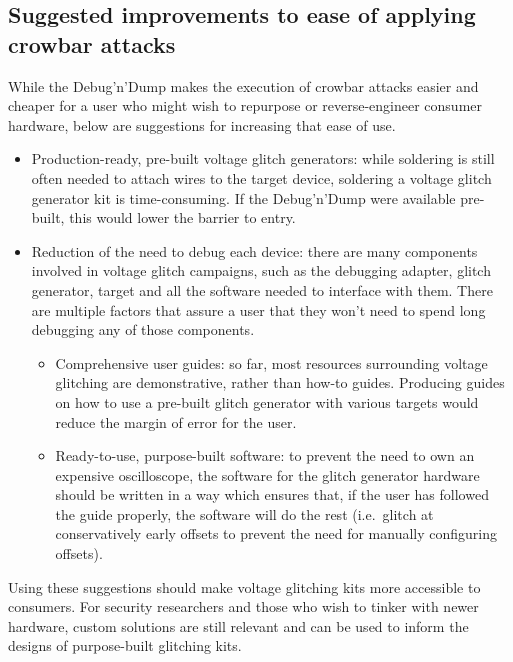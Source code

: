 \hypertarget{suggested-improvements-to-ease-of-applying-crowbar-attacks}{%
\subsection{Suggested improvements to ease of applying crowbar
attacks}\label{suggested-improvements-to-ease-of-applying-crowbar-attacks}}

While the Debug'n'Dump makes the execution of crowbar attacks easier and
cheaper for a user who might wish to repurpose or reverse-engineer
consumer hardware, below are suggestions for increasing that ease of
use.

\begin{itemize}
\tightlist
\item
  Production-ready, pre-built voltage glitch generators: while soldering
  is still often needed to attach wires to the target device, soldering
  a voltage glitch generator kit is time-consuming. If the Debug'n'Dump
  were available pre-built, this would lower the barrier to entry.
\item
  Reduction of the need to debug each device: there are many components
  involved in voltage glitch campaigns, such as the debugging adapter,
  glitch generator, target and all the software needed to interface with
  them. There are multiple factors that assure a user that they won't
  need to spend long debugging any of those components.

  \begin{itemize}
  \tightlist
  \item
    Comprehensive user guides: so far, most resources surrounding
    voltage glitching are demonstrative, rather than how-to guides.
    Producing guides on how to use a pre-built glitch generator with
    various targets would reduce the margin of error for the user.
  \item
    Ready-to-use, purpose-built software: to prevent the need to own an
    expensive oscilloscope, the software for the glitch generator
    hardware should be written in a way which ensures that, if the user
    has followed the guide properly, the software will do the rest
    (i.e.~glitch at conservatively early offsets to prevent the need for
    manually configuring offsets).
  \end{itemize}
\end{itemize}

Using these suggestions should make voltage glitching kits more
accessible to consumers. For security researchers and those who wish to
tinker with newer hardware, custom solutions are still relevant and can
be used to inform the designs of purpose-built glitching kits.

